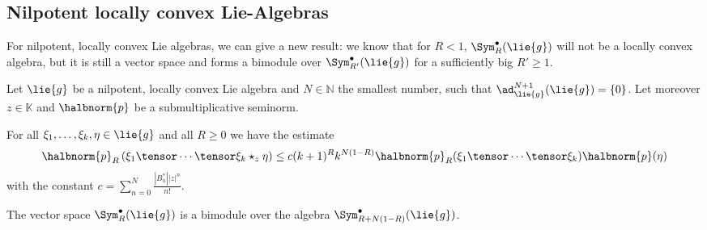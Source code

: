 \documentclass[
11pt,                          %
english                        %
]{article}
\begin{document}
\subsection{Nilpotent locally convex Lie-Algebras}
For nilpotent, locally convex Lie algebras, we can give a new result: we know that 
for $R < 1$, $\Sym_R^{\bullet}(\lie{g})$ will not be a locally convex algebra, but it 
is still a vector space and forms a bimodule over $\Sym_{R'}^{\bullet}(\lie{g})$ for 
a sufficiently big $R' \geq 1$.
\begin{proposition}
	\label{prop:bimodules}
	Let $\lie{g}$ be a nilpotent, locally convex Lie algebra and $N \in \mathbb{N}$ 
	the smallest number, such that $\ad_{\lie{g}}^{N+1}(\lie{g}) = \{ 0 \}$. Let 
	moreover $z \in \mathbb{K}$ and $\halbnorm{p}$ be a submultiplicative seminorm.
	\begin{propositionlist}
		\item
		For all $\xi_1, \ldots, \xi_k, \eta \in \lie{g}$ and all $R \geq 0$ we have 
		the estimate
		\begin{equation}
			\halbnorm{p}_R
			\left(
				\xi_1 \tensor \cdots \tensor \xi_k \star_z \eta
			\right)
			\leq
			c (k+1)^R k^{N(1-R)}
			\halbnorm{p}_R(\xi_1 \tensor \cdots \tensor \xi_k)
			\halbnorm{p}(\eta)
		\end{equation}
		with the constant $c = \sum_{n = 0}^N \frac{|B_n^*| |z|^n}{n!}$.
		
		\item
		The vector space $\Sym_R^{\bullet}(\lie{g})$ is a bimodule over the algebra 
		$\Sym_{R + N(1-R)}^{\bullet}(\lie{g})$.
	\end{propositionlist}
\end{proposition}
\end{document}
